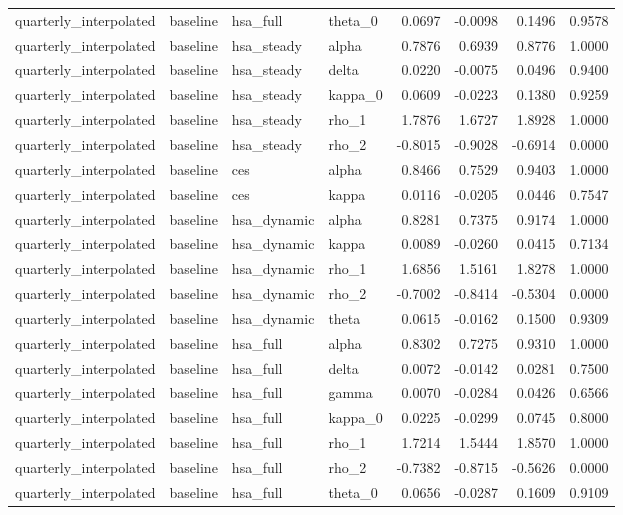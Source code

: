 \begin{tabular}{llllrrrr}
quarterly\_interpolated & baseline & hsa\_full & theta\_0 & 0.0697 & -0.0098 & 0.1496 & 0.9578 \\
quarterly\_interpolated & baseline & hsa\_steady & alpha & 0.7876 & 0.6939 & 0.8776 & 1.0000 \\
quarterly\_interpolated & baseline & hsa\_steady & delta & 0.0220 & -0.0075 & 0.0496 & 0.9400 \\
quarterly\_interpolated & baseline & hsa\_steady & kappa\_0 & 0.0609 & -0.0223 & 0.1380 & 0.9259 \\
quarterly\_interpolated & baseline & hsa\_steady & rho\_1 & 1.7876 & 1.6727 & 1.8928 & 1.0000 \\
quarterly\_interpolated & baseline & hsa\_steady & rho\_2 & -0.8015 & -0.9028 & -0.6914 & 0.0000 \\
quarterly\_interpolated & baseline & ces & alpha & 0.8466 & 0.7529 & 0.9403 & 1.0000 \\
quarterly\_interpolated & baseline & ces & kappa & 0.0116 & -0.0205 & 0.0446 & 0.7547 \\
quarterly\_interpolated & baseline & hsa\_dynamic & alpha & 0.8281 & 0.7375 & 0.9174 & 1.0000 \\
quarterly\_interpolated & baseline & hsa\_dynamic & kappa & 0.0089 & -0.0260 & 0.0415 & 0.7134 \\
quarterly\_interpolated & baseline & hsa\_dynamic & rho\_1 & 1.6856 & 1.5161 & 1.8278 & 1.0000 \\
quarterly\_interpolated & baseline & hsa\_dynamic & rho\_2 & -0.7002 & -0.8414 & -0.5304 & 0.0000 \\
quarterly\_interpolated & baseline & hsa\_dynamic & theta & 0.0615 & -0.0162 & 0.1500 & 0.9309 \\
quarterly\_interpolated & baseline & hsa\_full & alpha & 0.8302 & 0.7275 & 0.9310 & 1.0000 \\
quarterly\_interpolated & baseline & hsa\_full & delta & 0.0072 & -0.0142 & 0.0281 & 0.7500 \\
quarterly\_interpolated & baseline & hsa\_full & gamma & 0.0070 & -0.0284 & 0.0426 & 0.6566 \\
quarterly\_interpolated & baseline & hsa\_full & kappa\_0 & 0.0225 & -0.0299 & 0.0745 & 0.8000 \\
quarterly\_interpolated & baseline & hsa\_full & rho\_1 & 1.7214 & 1.5444 & 1.8570 & 1.0000 \\
quarterly\_interpolated & baseline & hsa\_full & rho\_2 & -0.7382 & -0.8715 & -0.5626 & 0.0000 \\
quarterly\_interpolated & baseline & hsa\_full & theta\_0 & 0.0656 & -0.0287 & 0.1609 & 0.9109 \\

\end{tabular}
